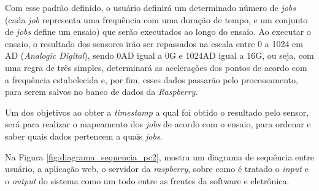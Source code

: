 Com esse padrão definido, o usuário definirá um determinado número de \textit{jobs} (cada \textit{job} representa uma frequência com uma duração de tempo, 
e um conjunto de \textit{jobs} define um ensaio) que serão executados ao longo do ensaio. Ao executar o ensaio, o resultado dos sensores irão ser 
repassados na escala entre 0 a 1024 em AD (\textit{Analogic Digital}), sendo 0AD igual a 0G e 1024AD igual a 16G, ou seja, com uma regra de três simples,
determinará as acelerações dos pontos de acordo com a frequência estabelecida e, por fim, esses dados passarão pelo processamento, para serem salvos no 
banco de dados da \textit{Raspberry}.

Um dos objetivos ao obter a \textit{timestamp} a qual foi obtido o resultado pelo sensor, será para realizar o mapeamento dos \textit{jobs} de acordo 
com o ensaio, para ordenar e saber quais dados pertencem a quais \textit{jobs}.

Na Figura \ref{fig:diagrama_sequencia_pc2}, mostra um diagrama de sequência entre usuário, a aplicação web, o servidor da \textit{raspberry}, sobre 
como é tratado o \textit{input} e o \textit{output} do sistema como um todo entre as frentes da software e eletrônica.

